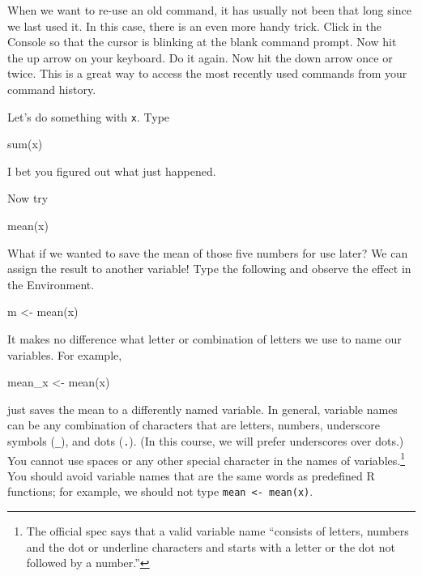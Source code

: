 \documentclass[
]{book}
\newenvironment{Shaded}{\begin{snugshade}}{\end{snugshade}}
\newcommand{\FunctionTok}[1]{\textcolor[rgb]{0.00,0.00,0.00}{#1}}
\newcommand{\NormalTok}[1]{#1}
\newcommand{\OtherTok}[1]{\textcolor[rgb]{0.56,0.35,0.01}{#1}}
\begin{document}
When we want to re-use an old command, it has usually not been that long since we last used it. In this case, there is an even more handy trick. Click in the Console so that the cursor is blinking at the blank command prompt. Now hit the up arrow on your keyboard. Do it again. Now hit the down arrow once or twice. This is a great way to access the most recently used commands from your command history.

Let's do something with \texttt{x}. Type

\begin{Shaded}
\begin{Highlighting}[]
\FunctionTok{sum}\NormalTok{(x)}
\end{Highlighting}
\end{Shaded}

I bet you figured out what just happened.

Now try

\begin{Shaded}
\begin{Highlighting}[]
\FunctionTok{mean}\NormalTok{(x)}
\end{Highlighting}
\end{Shaded}

What if we wanted to save the mean of those five numbers for use later? We can assign the result to another variable! Type the following and observe the effect in the Environment.

\begin{Shaded}
\begin{Highlighting}[]
\NormalTok{m }\OtherTok{\textless{}{-}} \FunctionTok{mean}\NormalTok{(x)}
\end{Highlighting}
\end{Shaded}

It makes no difference what letter or combination of letters we use to name our variables. For example,

\begin{Shaded}
\begin{Highlighting}[]
\NormalTok{mean\_x }\OtherTok{\textless{}{-}} \FunctionTok{mean}\NormalTok{(x)}
\end{Highlighting}
\end{Shaded}

just saves the mean to a differently named variable. In general, variable names can be any combination of characters that are letters, numbers, underscore symbols (\texttt{\_}), and dots (\texttt{.}). (In this course, we will prefer underscores over dots.) You cannot use spaces or any other special character in the names of variables.\footnote{The official spec says that a valid variable name ``consists of letters, numbers and the dot or underline characters and starts with a letter or the dot not followed by a number.''} You should avoid variable names that are the same words as predefined R functions; for example, we should not type \texttt{mean\ \textless{}-\ mean(x)}.
\end{document}

